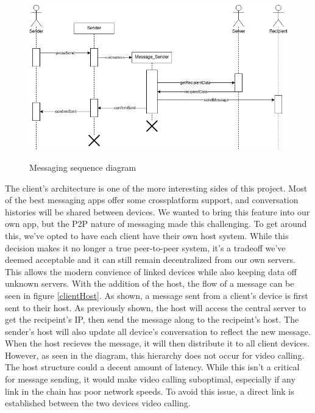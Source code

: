 \documentclass[titlepage]{article}
\begin{document}
    \begin{center}
        \begin{figure}[!ht]
            \includegraphics[scale=.5]{graphics/SequenceDiagram.png}
            \label{sequence}
            \caption{Messaging sequence diagram}
        \end{figure}
    \end{center}

    The client's architecture is one of the more interesting sides of this project.
    Most of the best messaging apps offer some crossplatform support, and conversation histories will be shared between devices.
    We wanted to bring this feature into our own app, but the P2P nature of messaging made this challenging.
    To get around this, we've opted to have each client have their own host system.
    While this decision makes it no longer a true peer-to-peer system, it's a tradeoff we've deemed acceptable and it can still remain decentralized from our own servers.
    This allows the modern convience of linked devices while also keeping data off unknown servers.
    With the addition of the host, the flow of a message can be seen in figure \ref{clientHost}.
    As shown, a message sent from a client's device is first sent to their host.
    As previously shown, the host will access the central server to get the recipeint's IP, then send the message along to the recipeint's host.
    The sender's host will also update all device's conversation to reflect the new message.
    When the host recieves the message, it will then distribute it to all client devices.
    However, as seen in the diagram, this hierarchy does not occur for video calling.
    The host structure could a decent amount of latency.
    While this isn't a critical for message sending, it would make video calling suboptimal, especially if any link in the chain has poor network speeds.
    To avoid this issue, a direct link is established between the two devices video calling.
\end{document}
